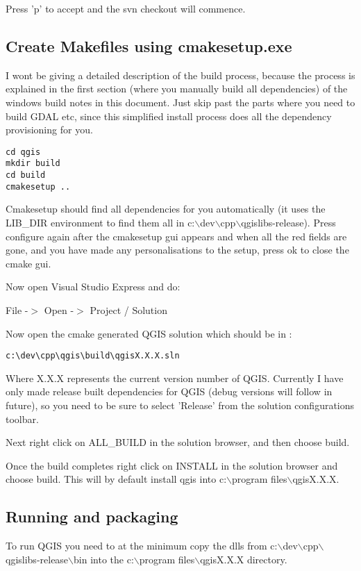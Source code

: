 Press 'p' to accept and the svn checkout will commence.

\subsection{Create Makefiles using cmakesetup.exe}
I wont be giving a detailed description of the build process, because 
the process is explained in the first section (where you manually build 
all dependencies) of the windows build notes in this document. Just skip 
past the parts where you need to build GDAL etc, since this simplified 
install process does all the dependency provisioning for you.

\begin{verbatim}
cd qgis
mkdir build
cd build
cmakesetup ..
\end{verbatim}

Cmakesetup should find all dependencies for you automatically (it uses the 
LIB\_DIR environment to find them all in c:$\backslash$dev$\backslash$cpp$\backslash$qgislibs-release). 
Press configure again after the cmakesetup gui appears and when all the red 
fields are gone, and you have made any personalisations to the setup, press 
ok to close the cmake gui.

Now open Visual Studio Express and do:

File -$>$ Open -$>$ Project / Solution

Now open the cmake generated QGIS solution which should be in :

\begin{verbatim}
c:\dev\cpp\qgis\build\qgisX.X.X.sln
\end{verbatim}

Where X.X.X represents the current version number of QGIS. Currently I 
have only made release built dependencies for QGIS (debug versions will follow 
in future), so you need to be sure to select 'Release' from the solution 
configurations toolbar.

Next right click on ALL\_BUILD in the solution browser, and then choose build.

Once the build completes right click on INSTALL in the solution browser and 
choose build. This will by default install qgis into c:$\backslash$program files$\backslash$qgisX.X.X.

\subsection{Running and packaging}
To run QGIS you need to at the minimum copy the dlls from c:$\backslash$dev$\backslash$cpp$\backslash$qgislibs-release$\backslash$bin 
into the c:$\backslash$program files$\backslash$qgisX.X.X directory.

